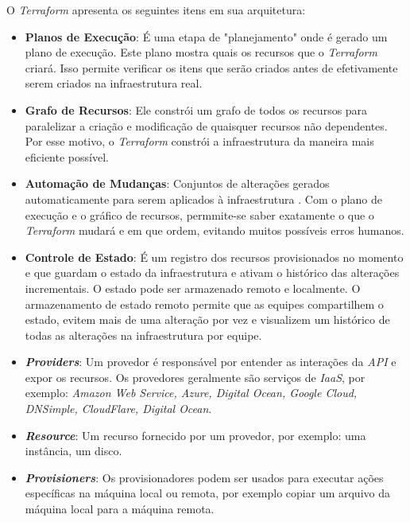 O \textit{Terraform} apresenta os seguintes itens em sua arquitetura:
 \begin{itemize}

\item \textbf{Planos de Execução}: É uma etapa de "planejamento"  onde é gerado um plano de execução. Este  plano mostra quais os recursos que o \textit{Terraform} criará. Isso permite verificar os itens que serão criados antes de efetivamente serem criados na infraestrutura real.

\item \textbf{Grafo de Recursos}: Ele constrói um grafo de todos os recursos para paralelizar a criação e modificação de quaisquer recursos não dependentes. Por esse motivo, o \textit{Terraform} constrói a infraestrutura da maneira mais eficiente possível.

\item \textbf{Automação de Mudanças}: Conjuntos de alterações gerados automaticamente para serem aplicados à infraestrutura . Com o plano de execução e o gráfico de recursos, permmite-se saber exatamente o que o \textit{Terraform} mudará e em que ordem, evitando muitos possíveis erros humanos.

\item \textbf{Controle de Estado}: É um registro dos recursos provisionados no momento e que guardam o estado da infraestrutura e ativam o histórico das alterações incrementais. O estado pode ser armazenado remoto e localmente. O armazenamento de estado remoto permite que as equipes compartilhem o estado, evitem mais de uma alteração por vez e visualizem um histórico de todas as alterações na infraestrutura por equipe.

\item \textbf{\textit{Providers}}: Um provedor é responsável por entender as interações da \textit{API} e expor os recursos. Os provedores geralmente são serviços de \textit{IaaS},  por exemplo: \textit{Amazon
Web Service, Azure, Digital Ocean, Google Cloud, DNSimple, CloudFlare, Digital Ocean}.

\item \textbf{\textit{Resource}}: Um recurso fornecido por um provedor, por exemplo: uma instância, um disco.   

\item \textbf{\textit{Provisioners}}: Os provisionadores podem ser usados para executar ações específicas na máquina local ou remota, por exemplo copiar um arquivo da máquina local para a máquina remota.


\end{itemize}
